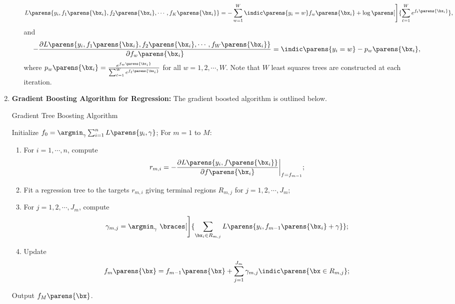 \documentclass[12pt]{article}
\begin{document}
\begin{enumerate}[label=\textbf{\arabic*.}]
\begin{itemize}
\begin{align*}
			L \parens{y_i, f_{1} \parens{\bx_i}, f_{2} \parens{\bx_i}, \cdots, f_{K} \parens{\bx_i}} = - \sum_{w=1}^W \indic \parens{y_i = w} f_w \parens{\bx_i} + \log \parens[\Bigg]{\sum_{\ell = 1}^W e^{f_{\ell} \parens{\bx_i}}}, 
		\end{align*} 
		and 
		\begin{align*}
			- \frac{\partial L \parens{y_i, f_{1} \parens{\bx_i}, f_{2} \parens{\bx_i}, \cdots, f_{W} \parens{\bx_i}} }{\partial f_{w}\parens{\bx_i}} = \indic \parens{y_i = w} - p_w \parens{\bx_i}, 
		\end{align*}
		where $p_w \parens{\bx_i} = \frac{e^{f_w \parens{\bx_i}}}{\sum_{\ell = 1}^W e^{f_{\ell} \parens{\bx_i}}}$ for all $w = 1, 2, \cdots, W$. Note that $W$ least squares trees are constructed at each iteration. 

	\end{itemize} 
	
	\item \textbf{Gradient Boosting Algorithm for Regression:} The gradient boosted algorithm is outlined below. 
	
	\begin{minipage}{\linewidth}
		\begin{algorithm}[H]
		\caption{Gradient Tree Boosting Algorithm}\label{algo-gradient-boosting}
		\begin{algorithmic}[1]
			\STATE Initialize $f_0 = \argmin_{\gamma} \sum_{i=1}^n L \parens{y_i, \gamma}$; 
			\STATE For $m = 1$ to $M$: 
			\begin{enumerate}
				\item For $ i = 1, \cdots, n$, compute
				\begin{align*}
					r_{m,i} = - \frac{\partial L \parens{y_i, f \parens{\bx_i}}}{\partial f \parens{\bx_i}} \bigg\vert_{f = f_{m-1}}; 
				\end{align*}
				\item Fit a regression tree to the targets $r_{m, i}$ giving terminal regions $R_{m,j}$ for $j = 1, 2, \cdots, J_m$; 
				\item For $j = 1, 2, \cdots, J_m$, compute
				\begin{align*}
					\gamma_{m, j} = \argmin_{\gamma} \ \braces[\Bigg]{\sum_{\bx_i \in R_{m,j}} L \parens{y_i, f_{m-1} \parens{\bx_i} + \gamma}}; 
				\end{align*}
				\item Update 
				\begin{align*}
					f_m \parens{\bx} = f_{m-1} \parens{\bx} + \sum_{j=1}^{J_m} \gamma_{m,j} \indic \parens{\bx \in R_{m, j}}; 
				\end{align*} 
			\end{enumerate}
			\STATE Output $f_M \parens{\bx}$. 
		\end{algorithmic}
		\end{algorithm}
	\end{minipage}
	

\end{enumerate}
\end{document}
